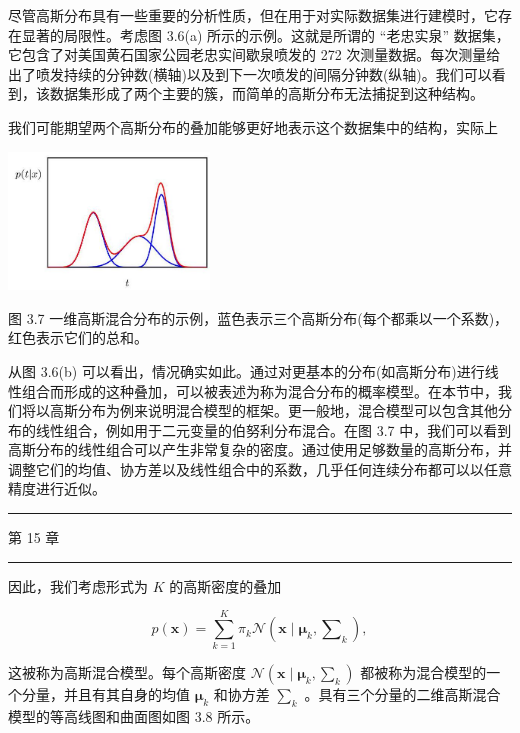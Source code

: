 \documentclass[10pt]{report}
\newcommand{\HRule}{\begin{center}\rule{0.9\linewidth}{0.2mm}\end{center}}
\begin{document}
尽管高斯分布具有一些重要的分析性质，但在用于对实际数据集进行建模时，它存在显著的局限性。考虑图 3.6(a) 所示的示例。这就是所谓的 “老忠实泉” 数据集，它包含了对美国黄石国家公园老忠实间歇泉喷发的 272 次测量数据。每次测量给出了喷发持续的分钟数(横轴)以及到下一次喷发的间隔分钟数(纵轴)。我们可以看到，该数据集形成了两个主要的簇，而简单的高斯分布无法捕捉到这种结构。

我们可能期望两个高斯分布的叠加能够更好地表示这个数据集中的结构，实际上

\begin{center}
\includegraphics[max width=0.4\textwidth]{images/0194e279-9b28-703a-88f4-c3ac21e2010d_106_1020_344_531_365_0.jpg}
\end{center}
\hspace*{3em} 

图 3.7 一维高斯混合分布的示例，蓝色表示三个高斯分布(每个都乘以一个系数)，红色表示它们的总和。

从图 3.6(b) 可以看出，情况确实如此。通过对更基本的分布(如高斯分布)进行线性组合而形成的这种叠加，可以被表述为称为混合分布的概率模型。在本节中，我们将以高斯分布为例来说明混合模型的框架。更一般地，混合模型可以包含其他分布的线性组合，例如用于二元变量的伯努利分布混合。在图 3.7 中，我们可以看到高斯分布的线性组合可以产生非常复杂的密度。通过使用足够数量的高斯分布，并调整它们的均值、协方差以及线性组合中的系数，几乎任何连续分布都可以以任意精度进行近似。

\HRule

第 15 章

\HRule

因此，我们考虑形式为 \(K\) 的高斯密度的叠加

\[
p\left( \mathbf{x}\right)  = \mathop{\sum }\limits_{{k = 1}}^{K}{\pi }_{k}\mathcal{N}\left( {\mathbf{x} \mid  {\mathbf{\mu }}_{k},{\mathbf{\sum }}_{k}}\right) , \tag{3.111}
\]

这被称为高斯混合模型。每个高斯密度 \(\mathcal{N}\left( {\mathbf{x} \mid  {\mathbf{\mu }}_{k},{\mathbf{\sum }}_{k}}\right)\) 都被称为混合模型的一个分量，并且有其自身的均值 \({\mathbf{\mu }}_{k}\) 和协方差 \({\mathbf{\sum }}_{k}\) 。具有三个分量的二维高斯混合模型的等高线图和曲面图如图 3.8 所示。
\end{document}
